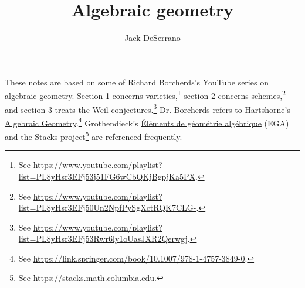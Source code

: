 \documentclass [11 pt, oneside] {article}
\title {Algebraic geometry}
\author {Jack DeSerrano}
\begin{document}
\ifams
    \vspace*{\fill}
\fi
\maketitle
\thispagestyle{empty}
These notes are based on some of Richard Borcherds's YouTube series on algebraic geometry. 
Section 1 concerns varieties,\footnote{See \url{https://www.youtube.com/playlist?list=PL8yHsr3EFj53j51FG6wCbQKjBgpjKa5PX}.} 
section 2 concerns schemes,\footnote{See \url{https://www.youtube.com/playlist?list=PL8yHsr3EFj50Un2NpfPySgXctRQK7CLG-}.} 
and section 3 treats the Weil conjectures.\footnote{See \url{https://www.youtube.com/playlist?list=PL8yHsr3EFj53Rwr6ly1oUasJXR2Qerwgj}.} 
Dr. Borcherds refers to Hartshorne's \ul{Algebraic Geometry}.\footnote{See \url{https://link.springer.com/book/10.1007/978-1-4757-3849-0}.} 
Grothendieck's \ul{\'El\'ements de g\'eom\'etrie alg\'ebrique} (EGA) and the Stacks project\footnote{See \url{https://stacks.math.columbia.edu}.} are referenced frequently.
\hypersetup{linkcolor = black}
\end{document}
